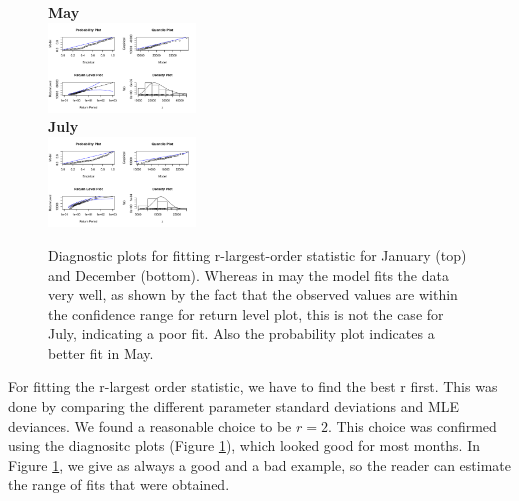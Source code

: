 \documentclass[10pt,conference,compsocconf]{IEEEtran}
\begin{document}
\par
\begin{figure}
	\centering
	\textbf{May}\\
	\includegraphics[width=0.35\textwidth]{../plots/r_larg_diag_may.pdf}\\
	\textbf{July}\\
	\includegraphics[width=0.35\textwidth]{../plots/r_larg_diag_july.pdf}
	\caption{Diagnostic plots for fitting r-largest-order statistic for January (top) and December (bottom). Whereas in may the model fits the data very well, as shown by the fact that the observed values are within the confidence range for return level plot, this is not the case for July, indicating a poor fit. Also the probability plot indicates a better fit in May.}
	\label{fig:r_diag}
\end{figure}
For fitting the r-largest order statistic, we have to find the best r first. This was done by comparing the different parameter standard deviations and MLE deviances. We found a reasonable choice to be $r=2$. This choice was confirmed using the diagnositc plots (Figure \ref{fig:r_diag}), which looked good for most months. In Figure \ref{fig:r_diag}, we give as always a good and a bad example, so the reader can estimate the range of fits that were obtained.
\end{document}

